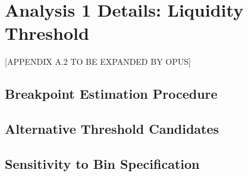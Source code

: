 \section{Analysis 1 Details: Liquidity Threshold}
\label{sec:A2}

[APPENDIX A.2 TO BE EXPANDED BY OPUS]

\subsection{Breakpoint Estimation Procedure}

\subsection{Alternative Threshold Candidates}

\subsection{Sensitivity to Bin Specification}
